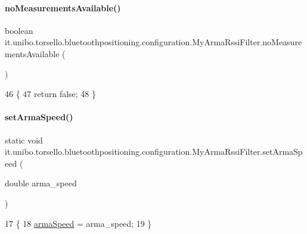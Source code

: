 \paragraph{\texorpdfstring{no\+Measurements\+Available()}{noMeasurementsAvailable()}}
{\footnotesize\ttfamily boolean it.\+unibo.\+torsello.\+bluetoothpositioning.\+configuration.\+My\+Arma\+Rssi\+Filter.\+no\+Measurements\+Available (\begin{DoxyParamCaption}{ }\end{DoxyParamCaption})}


\begin{DoxyCode}
46                                              \{
47         \textcolor{keywordflow}{return} \textcolor{keyword}{false};
48     \}
\end{DoxyCode}
\hypertarget{classit_1_1unibo_1_1torsello_1_1bluetoothpositioning_1_1configuration_1_1MyArmaRssiFilter_a87e5ed9b294bed2cedcbda1ee06bc8ee_a87e5ed9b294bed2cedcbda1ee06bc8ee}{}\label{classit_1_1unibo_1_1torsello_1_1bluetoothpositioning_1_1configuration_1_1MyArmaRssiFilter_a87e5ed9b294bed2cedcbda1ee06bc8ee_a87e5ed9b294bed2cedcbda1ee06bc8ee} 
\paragraph{\texorpdfstring{set\+Arma\+Speed()}{setArmaSpeed()}}
{\footnotesize\ttfamily static void it.\+unibo.\+torsello.\+bluetoothpositioning.\+configuration.\+My\+Arma\+Rssi\+Filter.\+set\+Arma\+Speed (\begin{DoxyParamCaption}\item[{double}]{arma\+\_\+speed }\end{DoxyParamCaption})\hspace{0.3cm}{\ttfamily [static]}}


\begin{DoxyCode}
17                                                        \{
18         \hyperlink{classit_1_1unibo_1_1torsello_1_1bluetoothpositioning_1_1configuration_1_1MyArmaRssiFilter_a5332b55e26b28536d1f8c7cae5e684b4_a5332b55e26b28536d1f8c7cae5e684b4}{armaSpeed} = arma\_speed;
19     \}
\end{DoxyCode}


